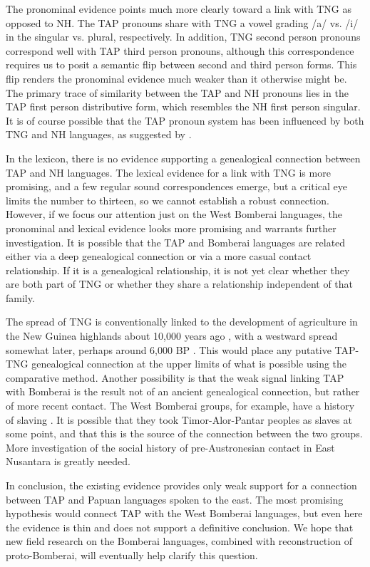 The pronominal evidence points much more clearly toward a link with TNG as opposed to NH. The TAP pronouns share with TNG a vowel grading /a/ vs. /i/ in the singular vs. plural, respectively. In addition, TNG second person pronouns correspond well with TAP third person pronouns, although this correspondence requires us to posit a semantic flip between second and third person forms. This flip renders the pronominal evidence much weaker than it otherwise might be. The primary trace of similarity between the TAP and NH pronouns lies in the TAP first person distributive form, which resembles the NH first person singular. It is of course possible that the TAP pronoun system has been influenced by both TNG and NH languages, as suggested by \citet{Donohue2008}.

In the lexicon, there is no evidence supporting a genealogical connection between TAP and NH languages. The lexical evidence for a link with TNG is more promising, and a few regular sound correspondences emerge, but a critical eye limits the number to thirteen, so we cannot establish a robust connection. However, if we focus our attention just on the West Bomberai languages, the pronominal and lexical evidence looks more promising and warrants further investigation. It is possible that the TAP and Bomberai languages are related either via a deep genealogical connection or via a more casual contact relationship. If it is a genealogical relationship, it is not yet clear whether they are both part of TNG or whether they share a relationship independent of that family.

The spread of TNG is conventionally linked to the development of agriculture in the New Guinea highlands about 10,000 years ago \citep{Bellwood2001}, with a westward spread somewhat later, perhaps around 6,000 BP \citep{Pawley1998}. This would place any putative TAP-TNG genealogical connection at the upper limits of what is possible using the comparative method. Another possibility is that the weak signal linking TAP with Bomberai is the result not of an ancient genealogical connection, but rather of more recent contact. The West Bomberai groups, for example, have a history of slaving \citep[109]{KlamerEtAl2008}. It is possible that they took Timor-Alor-Pantar peoples as slaves at some point, and that this is the source of the connection between the two groups. More investigation of the social history of pre-Austronesian contact in East Nusantara is greatly needed.

In conclusion, the existing evidence provides only weak support for a connection between TAP and Papuan languages spoken to the east. The most promising hypothesis would connect TAP with the West Bomberai languages, but even here the evidence is thin and does not support a definitive conclusion. We hope that new field research on the Bomberai languages, combined with reconstruction of proto-Bomberai, will eventually help clarify this question.

